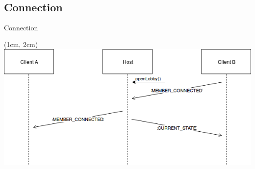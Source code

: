 \subsection{Connection}
\begin{frame}{Connection}
  
  \begin{textblock*}{5cm}(1cm, 2cm)
   \includegraphics[scale=0.51]{../report/res/img/ConnectionSchema}
  \end{textblock*}

\end{frame}
